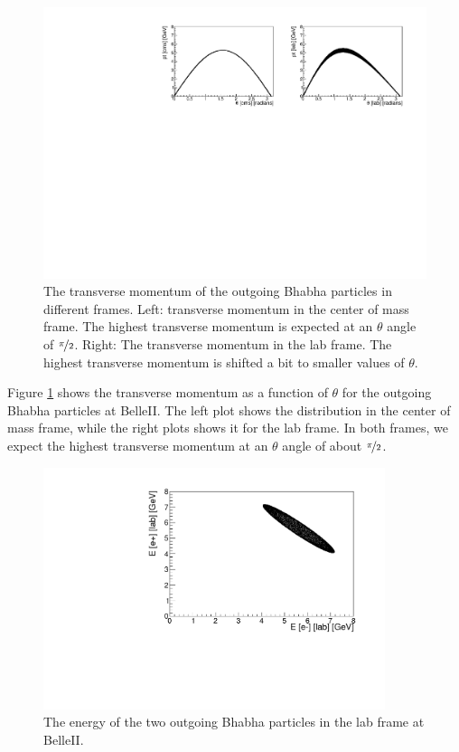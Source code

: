 \documentclass[a4paper,11pt,twosided,final,german,openbib,pdftex,listof=totoc,bibliography=totoc]{scrbook}
\begin{document}
\begin{figure}[h!]
	\centering
\includegraphics[width=\textwidth]{Bilder/CptTheta}
	\caption[$\theta$-Transverse Momentum-Distribution In The CMS And LAB Frame]{The transverse momentum of the outgoing Bhabha particles in different frames. Left: transverse momentum in the center of mass frame. The highest transverse momentum is expected at an $\theta$ angle of $\nicefrac{\pi}{2}$.  Right: The transverse momentum in the lab frame. The highest transverse momentum is shifted a bit to smaller values of $\theta$.}
	\label{fig:BelleIItMomentum}
\end{figure}


Figure \ref{fig:BelleIItMomentum} shows the transverse momentum as a function of $\theta$ for the outgoing Bhabha particles at BelleII. The left plot shows the distribution in the center of mass frame, while the right plots shows it for the lab frame. In both frames, we expect the highest transverse momentum at an $\theta$ angle of about $\nicefrac{\pi}{2}$.



\begin{figure}[h!]
	\centering
	\includegraphics[width=10cm]{Bilder/ee}
	\caption[Energies Of The Outgoing Particle In The LAB Frame]{The energy of the two outgoing Bhabha particles in the lab frame at BelleII.}
	\label{fig:EvsE}
\end{figure}
\end{document}

